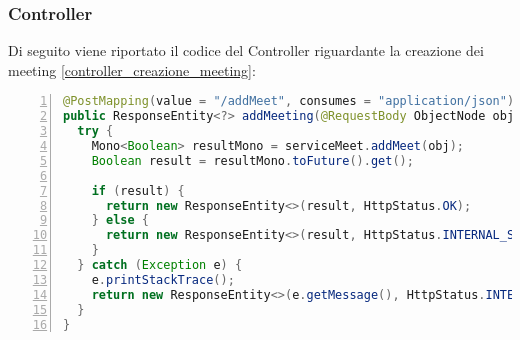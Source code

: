 \subsubsection{Controller}
Di seguito viene riportato il codice del Controller riguardante la creazione dei meeting \ref{controller_creazione_meeting}: 
\begin{lstlisting}[language=java, frame=lines, basicstyle=\ttfamily\scriptsize, numbers=left, 
  caption={controller creazione meeting}, label={controller_creazione_meeting}]
@PostMapping(value = "/addMeet", consumes = "application/json")
public ResponseEntity<?> addMeeting(@RequestBody ObjectNode obj) {
  try {
	Mono<Boolean> resultMono = serviceMeet.addMeet(obj);
	Boolean result = resultMono.toFuture().get();

	if (result) {
	  return new ResponseEntity<>(result, HttpStatus.OK);
	} else {
	  return new ResponseEntity<>(result, HttpStatus.INTERNAL_SERVER_ERROR);
	}
  } catch (Exception e) {
	e.printStackTrace();
	return new ResponseEntity<>(e.getMessage(), HttpStatus.INTERNAL_SERVER_ERROR);
  }
}    
\end{lstlisting}
